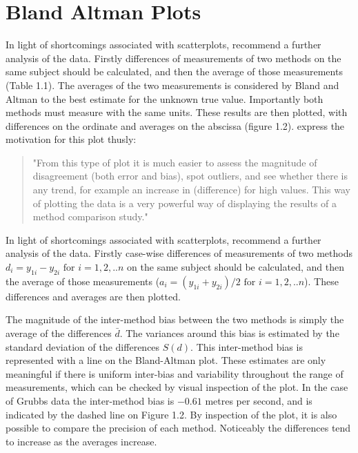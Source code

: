 \documentclass[Main.tex]{subfiles}
\begin{document}
	
	

	


	\section{Bland Altman Plots}


	
	
	In light of shortcomings associated with scatterplots,
	\citet*{BA83} recommend a further analysis of the data. Firstly
	differences of measurements of two methods on the same subject
	should  be calculated, and then the average of those measurements
	(Table 1.1). The averages of the two measurements is considered by
	Bland and Altman to the best estimate for the unknown true value.
	Importantly both methods must measure with the same units. These
	results are then plotted, with differences on the ordinate and
	averages on the abscissa (figure 1.2). \citet*{BA83}express the
	motivation for this plot thusly:
	\begin{quote}
		"From this type of plot it is much easier to assess the magnitude
		of disagreement (both error and bias), spot outliers, and see
		whether there is any trend, for example an increase in
		(difference) for high values. This way of plotting the data is a
		very powerful way of displaying the results of a method comparison
		study."
	\end{quote}
		

	
	In light of shortcomings associated with scatterplots,
	\citet*{BA83} recommend a further analysis of the data. Firstly
	case-wise differences of measurements of two methods $d_{i} =
	y_{1i}-y_{2i} \mbox{ for }i=1,2,..n$ on the same subject should be
	calculated, and then the average of those measurements ($a_{i} =
	(y_{1i} + y_{2i})/2 \mbox{ for }i=1,2,..n$). These differences and
	averages are then plotted. 
	
	The magnitude of the inter-method bias between the two methods is
	simply the average of the differences $\bar{d}$. The variances
	around this bias is estimated by the standard deviation of the
	differences $S(d)$. This inter-method bias is represented with a
	line on the Bland-Altman plot. These estimates are only meaningful
	if there is uniform inter-bias and variability throughout the
	range of measurements, which can be checked by visual inspection
	of the plot. In the case of Grubbs data the inter-method bias is
	$-0.61$ metres per second, and is indicated by the dashed line on
	Figure 1.2. By inspection of the plot, it is also possible to
	compare the precision of each method. Noticeably the differences
	tend to increase as the averages increase.
\end{document}
